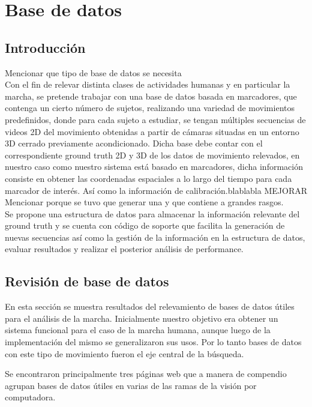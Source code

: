 \section{Base de datos}


\subsection{Introducción}
\label{}
Mencionar que tipo de base de datos se necesita\\
Con el fin de relevar distinta clases de actividades humanas y en particular la marcha, se pretende trabajar con una base de datos basada en marcadores, que contenga un cierto número de sujetos, realizando una variedad de movimientos predefinidos, donde para cada sujeto a estudiar, se tengan múltiples secuencias de videos 2D del movimiento obtenidas a partir de cámaras situadas en un entorno 3D cerrado previamente acondicionado. Dicha base debe contar con el correspondiente ground truth 2D y 3D de los datos de movimiento relevados, en nuestro caso como nuestro sistema está basado en marcadores, dicha información consiste en obtener las coordenadas espaciales a lo largo del tiempo para cada marcador de interés. Así como la información de calibración.blablabla MEJORAR \\

Mencionar porque se tuvo que generar una y que contiene a grandes rasgos.\\
Se propone una estructura de datos para almacenar la información relevante del ground truth y  se cuenta con código de soporte que facilita la generación de nuevas secuencias así como la gestión de la información en la estructura de datos, evaluar resultados y realizar el  posterior análisis de performance.

\subsection{Revisión de base de datos}
\label{}
En esta sección se muestra  resultados del relevamiento de bases de datos útiles para el análisis de la marcha.
Inicialmente nuestro objetivo era obtener un sistema funcional para el caso de la marcha humana, aunque luego de la implementación del mismo se generalizaron sus usos. Por lo tanto bases de datos con este tipo de movimiento fueron el eje central de la búsqueda.

Se encontraron principalmente tres páginas web que a manera de compendio agrupan  bases de datos útiles en varias de las ramas de la visión por computadora.\\

